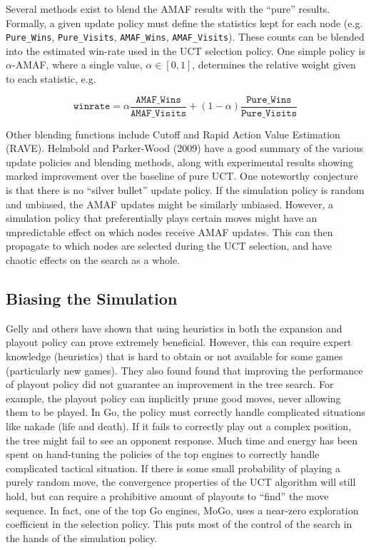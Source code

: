 \documentclass[11pt]{report}
\begin{document}
Several methods exist to blend the AMAF results with the ``pure'' results. Formally, a given update policy must define the statistics kept for each node (e.g. \texttt{Pure\_Wins}, \texttt{Pure\_Visits}, \texttt{AMAF\_Wins}, \texttt{AMAF\_Visits}). These counts can be blended into the estimated win-rate used in the UCT selection policy. One simple policy is $\alpha$-AMAF, where a single value, $\alpha \in [0, 1]$, determines the relative weight given to each statistic, e.g.

\[
\texttt{winrate} = \alpha\frac{\texttt{AMAF\_Wins}}{\texttt{AMAF\_Visits}} + (1 - \alpha)\frac{\texttt{Pure\_Wins}}{\texttt{Pure\_Visits}}
\]

Other blending functions include Cutoff and Rapid Action Value Estimation (RAVE)\cite{chaslot2008progressive}. Helmbold and Parker-Wood (2009) have a good summary of the various update policies and blending methods, along with experimental results showing marked improvement over the baseline of pure UCT\cite{helmbold2009all}. One noteworthy conjecture is that there is no ``silver bullet'' update policy. If the simulation policy is random and unbiased, the AMAF updates might be similarly unbiased. However, a simulation policy that preferentially plays certain moves might have an unpredictable effect on which nodes receive AMAF updates. This can then propagate to which nodes are selected during the UCT selection, and have chaotic effects on the search as a whole. 

\subsection{Biasing the Simulation}\label{bias}
Gelly and others have shown that using heuristics in both the expansion and playout policy can prove extremely beneficial\cite{gelly2006modification}\cite{gelly2008achieving}. However, this can require expert knowledge (heuristics) that is hard to obtain or not available for some games (particularly new games). They also found found that improving the performance of playout policy did not guarantee an improvement in the tree search. For example, the playout policy can implicitly prune good moves, never allowing them to be played. In Go, the policy must correctly handle complicated situations like nakade (life and death). If it fails to correctly play out a complex position, the tree might fail to see an opponent response. Much time and energy has been spent on hand-tuning the policies of the top engines to correctly handle complicated tactical situation. If there is some small probability of playing a purely random move, the convergence properties of the UCT algorithm will still hold, but can require a prohibitive amount of playouts to ``find'' the move sequence. In fact, one of the top Go engines, MoGo, uses a near-zero exploration coefficient in the selection policy\cite{gelly2007combining}. This puts most of the control of the search in the hands of the simulation policy.
\end{document}
